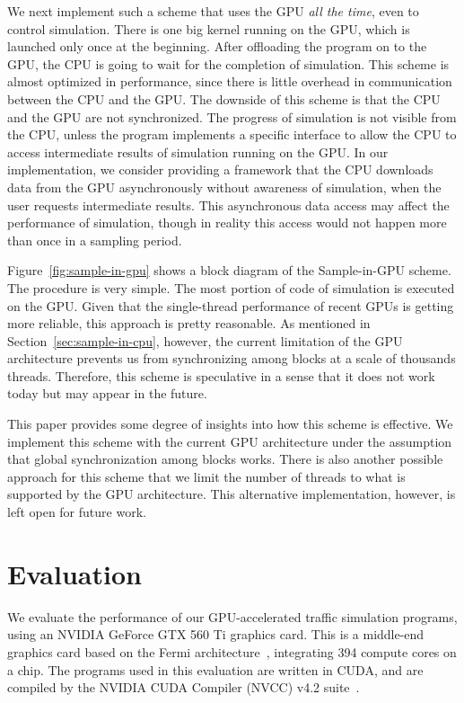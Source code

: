 \documentclass[times, 10pt, twocolumn]{article}
\begin{document}
We next implement such a scheme that uses the GPU \textit{all the time},
even to control simulation.
There is one big kernel running on the GPU, which is launched only once
at the beginning.
After offloading the program on to the GPU, the CPU is going to wait for
the completion of simulation.
This scheme is almost optimized in performance, since there is little
overhead in communication between the CPU and the GPU.
The downside of this scheme is that the CPU and the GPU are not
synchronized.
The progress of simulation is not visible from the CPU, unless the
program implements a specific interface to allow the CPU to access
intermediate results of simulation running on the GPU.
In our implementation, we consider providing a framework that the CPU
downloads data from the GPU asynchronously without awareness of
simulation, when the user requests intermediate results.
This asynchronous data access may affect the performance of simulation,
though in reality this access would not happen more than once in a
sampling period.

Figure~\ref{fig:sample-in-gpu} shows a block diagram of the
Sample-in-GPU scheme.
The procedure is very simple.
The most portion of code of simulation is executed on the GPU.
Given that the single-thread performance of recent GPUs is getting more
reliable, this approach is pretty reasonable.
As mentioned in Section~\ref{sec:sample-in-cpu}, however, the current
limitation of the GPU architecture prevents us from synchronizing among
blocks at a scale of thousands threads.
Therefore, this scheme is speculative in a sense that it does not work today
but may appear in the future.

This paper provides some degree of insights into how this scheme is
effective.
We implement this scheme with the current GPU architecture under the
assumption that global synchronization among blocks works.
There is also another possible approach for this scheme that we limit
the number of threads to what is supported by the GPU architecture.
This alternative implementation, however, is left open for future work.

\section{Evaluation}
\label{sec:evaluation}

We evaluate the performance of our GPU-accelerated traffic simulation
programs, using an NVIDIA GeForce GTX 560 Ti graphics card.
This is a middle-end graphics card based on the Fermi
architecture~\cite{NVIDIA_Fermi}, integrating 394 compute cores on a chip.
The programs used in this evaluation are written in CUDA, and are
compiled by the NVIDIA CUDA Compiler (NVCC) v4.2 suite~\cite{CUDA42}.
\end{document}
